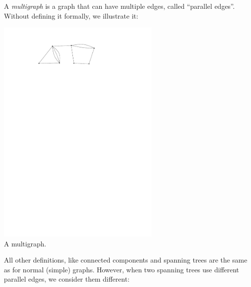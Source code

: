 \documentclass[11pt,a4paper,oneside]{article}
\begin{document}
A {\em multigraph} is a graph that can have multiple edges, called
``parallel edges''. Without defining 
it formally, we illustrate it:
\begin{center}
	\includegraphics[width=0.6\textwidth]{figures/multigraph.pdf}\\
	A multigraph.
\end{center}
All other definitions, like connected components and spanning trees
are the same as for normal (simple) graphs. However,
when two spanning trees use different parallel edges, we consider them
different:
\end{document}
